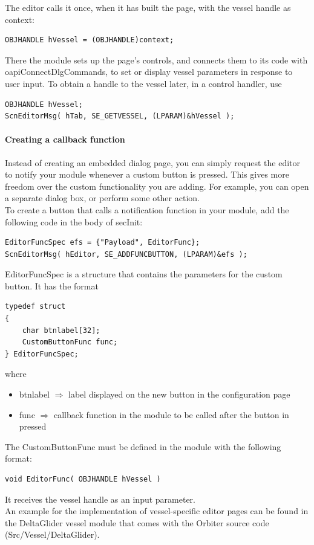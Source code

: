 \documentclass[Orbiter Developer Manual.tex]{subfiles}
\begin{document}
\noindent
The editor calls it once, when it has built the page, with the vessel handle as context:

\begin{lstlisting}
OBJHANDLE hVessel = (OBJHANDLE)context;
\end{lstlisting}

\noindent
There the module sets up the page's controls, and connects them to its code with oapiConnectDlgCommands, to set or display vessel parameters in response to user input. To obtain a handle to the vessel later, in a control handler, use

\begin{lstlisting}
OBJHANDLE hVessel;
ScnEditorMsg( hTab, SE_GETVESSEL, (LPARAM)&hVessel );
\end{lstlisting}

\paragraph{Creating a callback function}
Instead of creating an embedded dialog page, you can simply request the editor to notify your module whenever a custom button is pressed. This gives more freedom over the custom functionality you are adding. For example, you can open a separate dialog box, or perform some other action.\\
To create a button that calls a notification function in your module, add the following code in the body of secInit:

\begin{lstlisting}
EditorFuncSpec efs = {"Payload", EditorFunc};
ScnEditorMsg( hEditor, SE_ADDFUNCBUTTON, (LPARAM)&efs );
\end{lstlisting}

\noindent
EditorFuncSpec is a structure that contains the parameters for the custom button. It has the format

\begin{lstlisting}
typedef struct
{
	char btnlabel[32];
	CustomButtonFunc func;
} EditorFuncSpec;
\end{lstlisting}

\noindent
where

\begin{itemize}
\item btnlabel $\Rightarrow$ label displayed on the new button in the configuration page
\item func $\Rightarrow$ callback function in the module to be called after the button in pressed
\end{itemize}

\noindent
The CustomButtonFunc must be defined in the module with the following format:

\begin{lstlisting}
void EditorFunc( OBJHANDLE hVessel )
\end{lstlisting}

\noindent
It receives the vessel handle as an input parameter.\\
An example for the implementation of vessel-specific editor pages can be found in the DeltaGlider vessel module that comes with the Orbiter source code (Src/Vessel/DeltaGlider).
\end{document}
